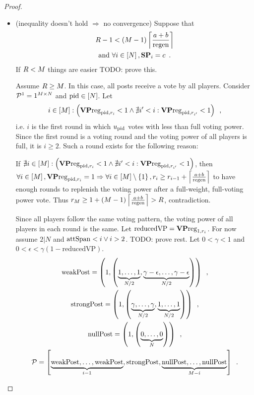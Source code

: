 \begin{proof}
\begin{itemize}
    \item (inequality doesn't hold $\Rightarrow$ no convergence) Suppose that
    \begin{gather}
      \label{conv:proof:fewrounds}
      \rounds - 1 < \left(\postlen - 1\right)\ceil*{\frac{a+b}{\regen}} \\
      \text{and } \forall i \in \left[\playerlen\right], \stpowvec_i = c
      \enspace. \nonumber
    \end{gather}
    If $\rounds < \postlen$ things are easier TODO: prove this.

    Assume $\rounds \geq \postlen$. In this case, all posts receive a vote by
    all players. Consider $\postlist^1 = 1^{\postlen \times \playerlen}$ and
    $\pid \in \left[\playerlen\right]$. Let
    \begin{equation*}
      i \in \left[\postlen\right] :\left(\votpowvecreg_{\pid, \round_i} < 1
      \wedge \nexists i' < i: \votpowvecreg_{\pid, \round_{i'}} < 1\right)
      \enspace,
    \end{equation*}
    i.e. $i$ is the first round in which $u_\pid$ votes with less than full
    voting power. Since the first round is a voting round and the voting power
    of all players is full, it is $i \geq 2$. Such a round exists for the
    following reason:

    If $\nexists i \in \left[\postlen\right] :\left(\votpowvecreg_{\pid,
    \round_i} < 1 \wedge \nexists i' < i: \votpowvecreg_{\pid, \round_{i'}} <
    1\right)$, then $\forall i \in \left[\postlen\right], \votpowvecreg_{\pid,
    \round_i} = 1 \Rightarrow \forall i \in \left[\postlen\right] \setminus
    \left\{1\right\}, \round_i \geq \round_{i - 1} + \ceil*{\frac{a +
    b}{\regen}}$ to have enough rounds to replenish the voting power after a
    full-weight, full-voting power vote. Thus $\round_\postlen \geq 1 +
    \left(\postlen - 1\right)\ceil*{\frac{a + b}{\regen}} > \rounds$,
    contradiction.

    Since all players follow the same voting pattern, the voting power of all
    players in each round is the same. Let $\mathrm{reducedVP} =
    \votpowvecreg_{1, \round_i}$. For now assume $2 | N$ and $\attspan < i \vee
    i > 2$. TODO: prove rest. Let $0 < \gamma < 1$ and $0 < \epsilon <
    \gamma\left(1 - \mathrm{reducedVP}\right)$.
    \begin{gather*}
      \mathrm{weakPost} = \left(1, \left(\underbrace{1, \dots,
      1}_{\playerlen/2}, \underbrace{\gamma - \epsilon, \dots, \gamma -
      \epsilon}_{\playerlen/2}\right)\right) \enspace, \\
      \mathrm{strongPost} = \left(1, \left(\underbrace{\gamma, \dots,
      \gamma}_{\playerlen/2}, \underbrace{1, \dots,
      1}_{\playerlen/2}\right)\right) \enspace, \\
      \mathrm{nullPost} = \left(1, \left(\underbrace{0, \dots,
      0}_{\playerlen}\right)\right) \enspace, \\
      \postlist = \left[\underbrace{\mathrm{weakPost}, \dots,
      \mathrm{weakPost}}_{i - 1}, \mathrm{strongPost},
      \underbrace{\mathrm{nullPost}, \dots, \mathrm{nullPost}}_{\postlen -
      i}\right] \enspace.
    \end{gather*}


\end{itemize}
\end{proof}
